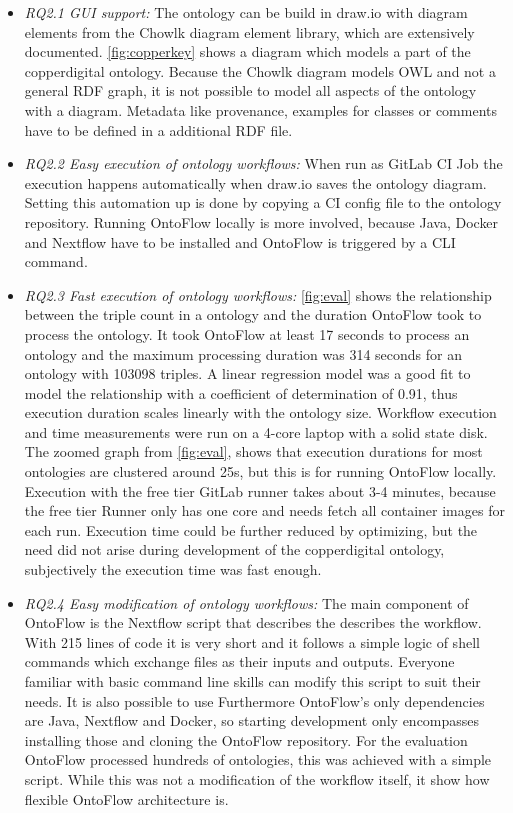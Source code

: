 \documentclass[sigconf]{acmart}
\begin{document}
\begin{itemize}[leftmargin=*]
\item \textit{RQ2.1 GUI support:} The ontology can be build in draw.io with diagram elements from the Chowlk diagram element library, which are extensively documented. \ref{fig:copperkey} shows a diagram which models a part of the copperdigital ontology. Because the Chowlk diagram models OWL and not a general RDF graph, it is not possible to model all aspects of the ontology with a diagram. Metadata like provenance, examples for classes or comments have to be defined in a additional RDF file.
\item \textit{RQ2.2 Easy execution of ontology workflows:} When run as GitLab CI Job the execution happens automatically when draw.io saves the ontology diagram. Setting this automation up is done by copying a CI config file to the ontology repository. Running OntoFlow locally is more involved, because Java, Docker and Nextflow have to be installed and OntoFlow is triggered by a CLI command.
\item \textit{RQ2.3 Fast execution of ontology workflows:} \ref{fig:eval} shows the relationship between the triple count in a ontology and the duration OntoFlow took to process the ontology. It took OntoFlow at least 17 seconds to process an ontology and the maximum processing duration was 314 seconds for an ontology with 103098 triples. A linear regression model was a good fit to model the relationship with a coefficient of determination of 0.91, thus execution duration scales linearly with the ontology size. Workflow execution and time measurements were run on a 4-core laptop with a solid state disk. 
The zoomed graph from \ref{fig:eval}, shows that execution durations for most ontologies are clustered around 25s, but this is for running OntoFlow locally. Execution with the free tier GitLab runner takes about 3-4 minutes, because the free tier Runner only has one core and needs fetch all container images for each run.
Execution time could be further reduced by optimizing, but the need did not arise during development of the copperdigital ontology, subjectively the execution time was fast enough.
\item \textit{RQ2.4 Easy modification of ontology workflows:} The main component of OntoFlow is the Nextflow script that describes the describes the workflow. With 215 lines of code it is very short and it follows a simple logic of shell commands which exchange files as their inputs and outputs. Everyone familiar with basic command line skills can modify this script to suit their needs. It is also possible to use  Furthermore OntoFlow's only dependencies are Java, Nextflow and Docker, so starting development only encompasses installing those and cloning the OntoFlow repository.
For the evaluation OntoFlow processed hundreds of ontologies, this was achieved with a simple script. While this was not a modification of the workflow itself, it show how flexible OntoFlow architecture is.
\end{itemize}
\end{document}

